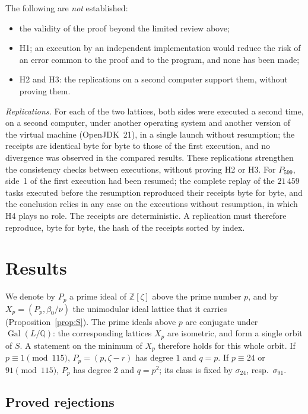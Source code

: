 \documentclass[11pt,a4paper]{amsart}
\theoremstyle{plain}
\theoremstyle{definition}
\numberwithin{equation}{section}
\newcommand{\Q}{\mathbb{Q}}
\newcommand{\Z}{\mathbb{Z}}
\DeclareMathOperator{\Gal}{Gal}
\begin{document}
The following are \emph{not} established:
\begin{itemize}
\item the validity of the proof beyond the limited review above;
\item H1; an execution by an independent implementation would reduce the risk of an error common to the proof and to the program, and none has been made;
\item H2 and H3: the replications on a second computer support them, without proving them.
\end{itemize}
\emph{Replications.} For each of the two lattices, both sides were executed a second time, on a second computer, under another operating system and another version of the virtual machine (OpenJDK~21), in a single launch without resumption; the receipts are identical byte for byte to those of the first execution, and no divergence was observed in the compared results. These replications strengthen the consistency checks between executions, without proving H2 or H3. For $P_{599}$, side~1 of the first execution had been resumed; the complete replay of the $21\,459$ tasks executed before the resumption reproduced their receipts byte for byte, and the conclusion relies in any case on the executions without resumption, in which H4 plays no role.
The receipts are deterministic. A replication must therefore reproduce, byte for byte, the hash of the receipts sorted by index.

\section{Results}\label{sec:resultats}

We denote by $P_p$ a prime ideal of $\Z[\zeta]$ above the prime number $p$, and by $X_p=(P_p,\beta_0/\nu)$ the unimodular ideal lattice that it carries (Proposition~\ref{prop:S}). The prime ideals above $p$ are conjugate under $\Gal(L/\Q)$: the corresponding lattices $X_p$ are isometric, and form a single orbit of $S$. A statement on the minimum of $X_p$ therefore holds for this whole orbit. If $p\equiv1\pmod{115}$, $P_p=(p,\zeta-r)$ has degree $1$ and $q=p$. If $p\equiv24$ or $91\pmod{115}$, $P_p$ has degree $2$ and $q=p^2$; its class is fixed by $\sigma_{24}$, resp.\ $\sigma_{91}$.

\subsection{Proved rejections}\label{subsec:rejets}
\end{document}
